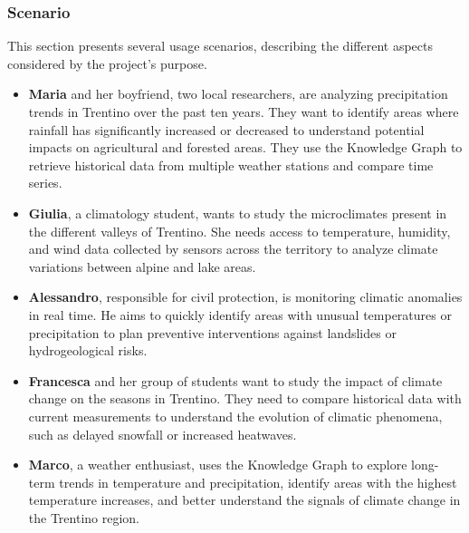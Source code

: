 \subsubsection{Scenario}
This section presents several usage scenarios, describing the different aspects considered by the project’s purpose.
\begin{itemize}
    \item \textbf{Maria} and her boyfriend, two local researchers, are analyzing precipitation trends in Trentino over the past ten years. They want to identify areas where rainfall has significantly increased or decreased to understand potential impacts on agricultural and forested areas. They use the Knowledge Graph to retrieve historical data from multiple weather stations and compare time series.
    \item \textbf{Giulia}, a climatology student, wants to study the microclimates present in the different valleys of Trentino. She needs access to temperature, humidity, and wind data collected by sensors across the territory to analyze climate variations between alpine and lake areas.
    \item \textbf{Alessandro}, responsible for civil protection, is monitoring climatic anomalies in real time. He aims to quickly identify areas with unusual temperatures or precipitation to plan preventive interventions against landslides or hydrogeological risks.
    \item \textbf{Francesca} and her group of students want to study the impact of climate change on the seasons in Trentino. They need to compare historical data with current measurements to understand the evolution of climatic phenomena, such as delayed snowfall or increased heatwaves.
    \item \textbf{Marco}, a weather enthusiast, uses the Knowledge Graph to explore long-term trends in temperature and precipitation, identify areas with the highest temperature increases, and better understand the signals of climate change in the Trentino region.
\end{itemize}

